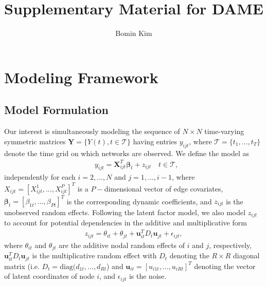 \documentclass[a4paper]{article}
\title{Supplementary Material for DAME}
\author{Bomin Kim}
\begin{document}
	\maketitle
	\section{Modeling Framework}
	\subsection{Model Formulation}\label{subsec: Model formulation}
	Our interest is simultaneously modeling the sequence of $N \times N$ time-varying symmetric  matrices $\boldsymbol{Y}=\{Y(t), t \in \mathcal{T}\}$ having entries $y_{ijt}$, where $\mathcal{T} = \{t_1,...,t_T\}$ denote the time grid on which networks are observed. We define the model as
	\begin{equation}
	\begin{aligned}
	&y_{ijt}=\boldsymbol{X}^T_{ijt}\boldsymbol{\beta}_t+z_{ijt}\quad t \in \mathcal{T},
	\end{aligned}
	\end{equation}
	independently for each $i=2,...,N$ and $j=1,...,i-1$, where $X_{ijt}=[X^1_{ijt},...,X^P_{ijt}]^T$ is a $P-$dimensional vector of edge covariates, $\boldsymbol{\beta}_t=[\beta_{1t},...,\beta_{Pt}]^T$ is the corresponding dynamic coefficients, and $z_{ijt}$ is the unobserved random effects. Following the latent factor model, we also model $z_{ijt}$ to account for potential dependencies in the additive and multiplicative form
	\begin{equation}
	\begin{aligned}
	z_{ijt} = \theta_{it}+\theta_{jt}+{\boldsymbol{u}_{it}^TD_t \boldsymbol{u}_{jt}}+\epsilon_{ijt},
	\end{aligned}
	\end{equation}
	where $\theta_{it}$ and $\theta_{jt}$ are the additive nodal random effects of $i$ and $j$, respectively, $\boldsymbol{u}_{it}^TD_t \boldsymbol{u}_{jt}$ is the multiplicative random effect with $D_t$ denoting the $R\times R$ diagonal matrix (i.e. $D_t= \mbox{diag}(d_{1t},...,d_{Rt}$) and $\boldsymbol{u}_{it}=[u_{i1t},...,u_{iRt}]^T$ denoting the vector of latent coordinates of node $i$, and $\epsilon_{ijt}$ is the noise.
\end{document}
